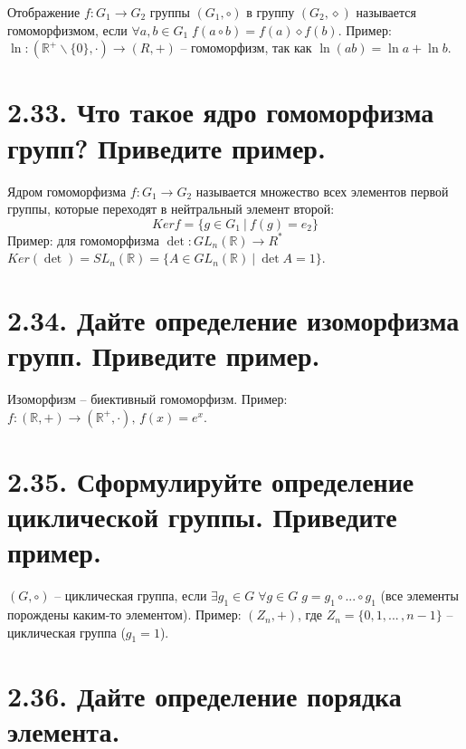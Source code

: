 \documentclass{article}
\begin{document}
Отображение $f : G_1 \rightarrow G_2$ группы $(G_1, \circ)$ в группу $(G_2, \diamond)$ называется гомоморфизмом, если $\forall a, b \in G_1 \; f(a \circ b) = f(a) \diamond f(b)$. 
\newline Пример: $\ln : (\mathbb{R}^+ \backslash \{0\}, \cdot) \rightarrow (R, +)$ -- гомоморфизм, так как $\ln{(ab)} = \ln{a} + \ln{b}$.

\section*{\LARGE 2.33. Что такое ядро гомоморфизма групп? Приведите пример.  }

Ядром гомоморфизма $f : G_1 \rightarrow G_2$ называется множество всех элементов первой группы, которые переходят в нейтральный элемент второй: $$Kerf = \{g \in G_1 \:|\: f(g) = e_2\}$$
Пример: для гомоморфизма $\det : GL_n(\mathbb{R}) \rightarrow R^*$ 
\newline $Ker(\det) = SL_n(\mathbb{R}) = \{A \in GL_n(\mathbb{R}) \:|\: \det{A} = 1\}$.

\section*{\LARGE 2.34. Дайте определение изоморфизма групп. Приведите пример. }

Изоморфизм -- биективный гомоморфизм. 
\newline Пример: $f : (\mathbb{R}, +) \rightarrow (\mathbb{R}^+, \cdot), \, f(x) = e^x$.

\section*{\LARGE 2.35. Сформулируйте определение циклической группы. Приведите пример.  }

$(G, \circ)$ -- циклическая группа, если $\exists g_1 \in G \; \forall g \in G \; g = g_1 \circ ... \circ g_1$ (все элементы порождены каким-то элементом). Пример: $(Z_n, +)$, где $Z_n = \{0, 1, ... \,, n - 1\}$ -- циклическая группа ($g_1 = 1$).

\section*{\LARGE 2.36. Дайте определение порядка элемента.  }
\end{document}
